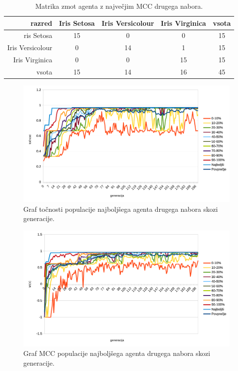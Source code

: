 \begin{table}[H]
    \centering
    \begin{tabular}{||rcccc||}
        \hline
        razred           & Iris Setosa & Iris Versicolour & Iris Virginica & vsota \\ \hline
        ris Setosa       & 15          & 0                & 0              & 15    \\ \hline
        Iris Versicolour & 0           & 14               & 1              & 15    \\ \hline
        Iris Virginica   & 0           & 0                & 15             & 15    \\ \hline
        vsota            & 15          & 14               & 16             & 45    \\ \hline
    \end{tabular}
    \caption{Matrika zmot agenta z največjim MCC drugega nabora.}
    \label{tab:iris_mcc_2}
\end{table}

\begin{figure}[H]
    \begin{center}
        \includegraphics[width=13cm]{iris/2/acc}
    \end{center}
    \caption{Graf točnosti populacije najboljšega agenta drugega nabora skozi generacije.}
    \label{fig:iris_acc_2}
\end{figure}

\begin{figure}[H]
    \begin{center}
        \includegraphics[width=13cm]{iris/2/mcc}
    \end{center}
    \caption{Graf MCC populacije najboljšega agenta drugega nabora skozi generacije.}
    \label{fig:iris_mcc_2}
\end{figure}

